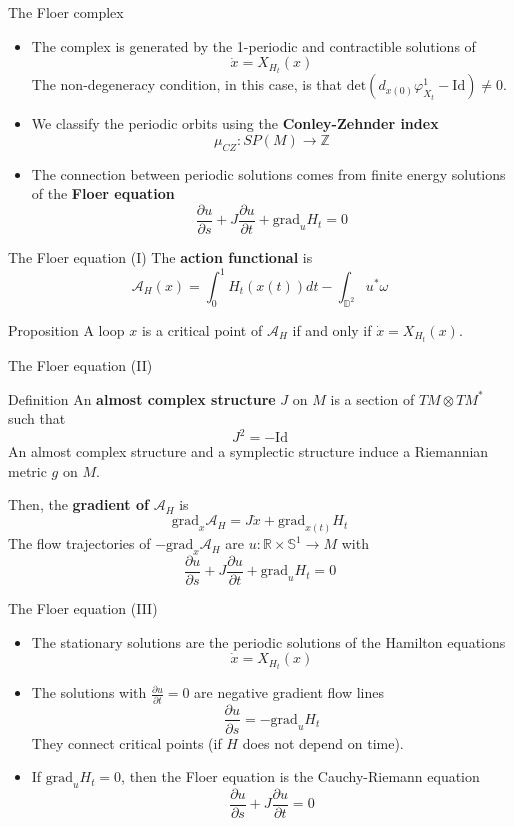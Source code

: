 \documentclass{beamer}
\newcommand{\con}[1]{\mathbb{#1}}
\newcommand{\R}{\con{R}}
\begin{document}
\begin{frame}{The Floer complex}
	\begin{itemize}
		\item The complex is generated by the 1-periodic and contractible solutions of
		\[\dot{x} = X_{H_t}(x)\]
		The non-degeneracy condition, in this case, is that $\mathrm{det}(d_{x(0)}\varphi_{X_t}^1 - \mathrm{Id}) \neq 0$.
		\item We classify the periodic orbits using the {\bf Conley-Zehnder index}
		\[\mu_{CZ} : SP(M) \longrightarrow \con{Z}\]
		\item The connection between periodic solutions comes from finite energy solutions of the {\bf Floer equation}
		\[\frac{\partial u}{\partial s} + J \frac{\partial u}{\partial t} + \mathrm{grad}_uH_t = 0\]
	\end{itemize}
\end{frame}

\begin{frame}{The Floer equation (I)}
	The {\bf action functional} is
	\[\mathcal{A}_H(x) = \int_0^1 H_t(x(t)) dt - \int_{\con{D}^2} u^{\ast} \omega\]

	\begin{block}{Proposition}
		A loop $x$ is a critical point of $\mathcal{A}_H$ if and only if $\dot{x} = X_{H_t}(x)$.
	\end{block}
\end{frame}

\begin{frame}{The Floer equation (II)}
	\begin{block}{Definition}
		An {\bf almost complex structure} $J$ on $M$ is a section of $TM\otimes TM^{\ast}$ such that
		\[J^2 = - \mathrm{Id}\]
		An almost complex structure and a symplectic structure induce a Riemannian metric $g$ on $M$.
	\end{block}

	Then, the {\bf gradient of} $\mathcal{A}_H$ is
	\[\mathrm{grad}_x\mathcal{A}_H = J \dot{x} + \mathrm{grad}_{x(t)}H_t\]
	The flow trajectories of $- \mathrm{grad}_x\mathcal{A}_H$ are $u : \R \times \con{S}^1 \rightarrow M$ with
	\[\frac{\partial u}{\partial s} + J \frac{\partial u}{\partial t} + \mathrm{grad}_uH_t = 0\]
\end{frame}

\begin{frame}{The Floer equation (III)}
	\begin{itemize}
		\item The stationary solutions are the periodic solutions of the Hamilton equations
		\[\dot{x} = X_{H_t}(x)\]
		\item The solutions with $\frac{\partial u}{\partial t} = 0$ are negative gradient flow lines
		\[\frac{\partial u}{\partial s} = - \mathrm{grad}_uH_t\]
		They connect critical points (if $H$ does not depend on time).
		\item If $\mathrm{grad}_uH_t = 0$, then the Floer equation is the Cauchy-Riemann equation
		\[\frac{\partial u}{\partial s} + J \frac{\partial u}{\partial t} = 0\]
	\end{itemize}
\end{frame}
\end{document}

